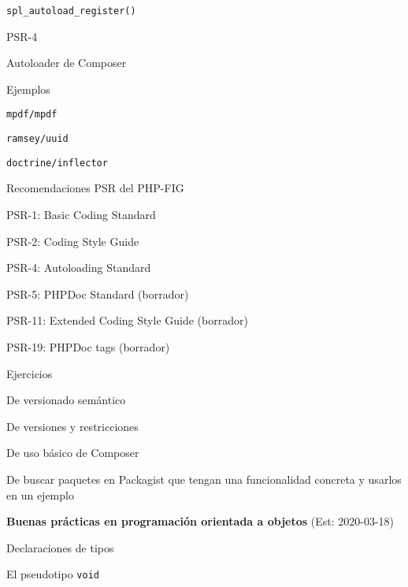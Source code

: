 \begin{longenum}
\begin{longenum}
        \begin{longenum}
            \item \texttt{spl\_autoload\_register()}
            \item PSR-4
            \item Autoloader de Composer
        \end{longenum}
        \item Ejemplos
        \begin{longenum}
            \item \texttt{mpdf/mpdf}
            \item \texttt{ramsey/uuid}
            \item \texttt{doctrine/inflector}
        \end{longenum}
        \item Recomendaciones PSR del PHP-FIG
        \begin{longenum}
            \item PSR-1: Basic Coding Standard
            \item PSR-2: Coding Style Guide
            \item PSR-4: Autoloading Standard
            \item PSR-5: PHPDoc Standard (borrador)
            \item PSR-11: Extended Coding Style Guide (borrador)
            \item PSR-19: PHPDoc tags (borrador)
        \end{longenum}
        \item Ejercicios
        \begin{longenum}
            \item De versionado semántico
            \item De versiones y restricciones
            \item De uso básico de Composer
            \item De buscar paquetes en Packagist que tengan una funcionalidad concreta y usarlos en un ejemplo
        \end{longenum}
    \end{longenum}
    \item \textbf{Buenas prácticas en programación orientada a objetos}  (Est: 2020-03-18)
    \begin{longenum}
        \item Declaraciones de tipos
        \begin{longenum}
            \item El pseudotipo \texttt{void}

\end{longenum}
\end{longenum}
\end{longenum}
